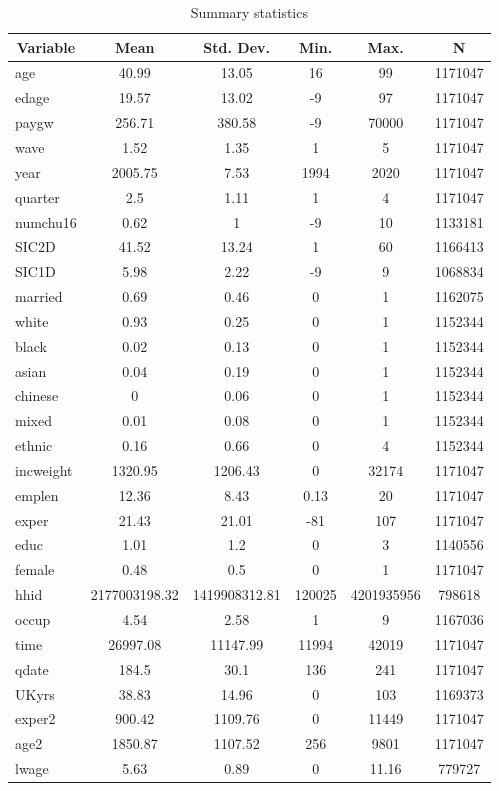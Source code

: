 
\begin{table}[htbp]\centering \caption{Summary statistics \label{sumstats}}
\begin{tabular}{l c c c c c}\hline\hline
\multicolumn{1}{c}{\textbf{Variable}} & \textbf{Mean}
 & \textbf{Std. Dev.}& \textbf{Min.} &  \textbf{Max.} & \textbf{N}\\ \hline
age & 40.99 & 13.05 & 16 & 99 & 1171047\\
edage & 19.57 & 13.02 & -9 & 97 & 1171047\\
paygw & 256.71 & 380.58 & -9 & 70000 & 1171047\\
wave & 1.52 & 1.35 & 1 & 5 & 1171047\\
year & 2005.75 & 7.53 & 1994 & 2020 & 1171047\\
quarter & 2.5 & 1.11 & 1 & 4 & 1171047\\
numchu16 & 0.62 & 1 & -9 & 10 & 1133181\\
SIC2D & 41.52 & 13.24 & 1 & 60 & 1166413\\
SIC1D & 5.98 & 2.22 & -9 & 9 & 1068834\\
married & 0.69 & 0.46 & 0 & 1 & 1162075\\
white & 0.93 & 0.25 & 0 & 1 & 1152344\\
black & 0.02 & 0.13 & 0 & 1 & 1152344\\
asian & 0.04 & 0.19 & 0 & 1 & 1152344\\
chinese & 0 & 0.06 & 0 & 1 & 1152344\\
mixed & 0.01 & 0.08 & 0 & 1 & 1152344\\
ethnic & 0.16 & 0.66 & 0 & 4 & 1152344\\
incweight & 1320.95 & 1206.43 & 0 & 32174 & 1171047\\
emplen & 12.36 & 8.43 & 0.13 & 20 & 1171047\\
exper & 21.43 & 21.01 & -81 & 107 & 1171047\\
educ & 1.01 & 1.2 & 0 & 3 & 1140556\\
female & 0.48 & 0.5 & 0 & 1 & 1171047\\
hhid & 2177003198.32 & 1419908312.81 & 120025 & 4201935956 & 798618\\
occup & 4.54 & 2.58 & 1 & 9 & 1167036\\
time & 26997.08 & 11147.99 & 11994 & 42019 & 1171047\\
qdate & 184.5 & 30.1 & 136 & 241 & 1171047\\
UKyrs & 38.83 & 14.96 & 0 & 103 & 1169373\\
exper2 & 900.42 & 1109.76 & 0 & 11449 & 1171047\\
age2 & 1850.87 & 1107.52 & 256 & 9801 & 1171047\\
lwage & 5.63 & 0.89 & 0 & 11.16 & 779727\\
\hline\end{tabular}
\end{table}
